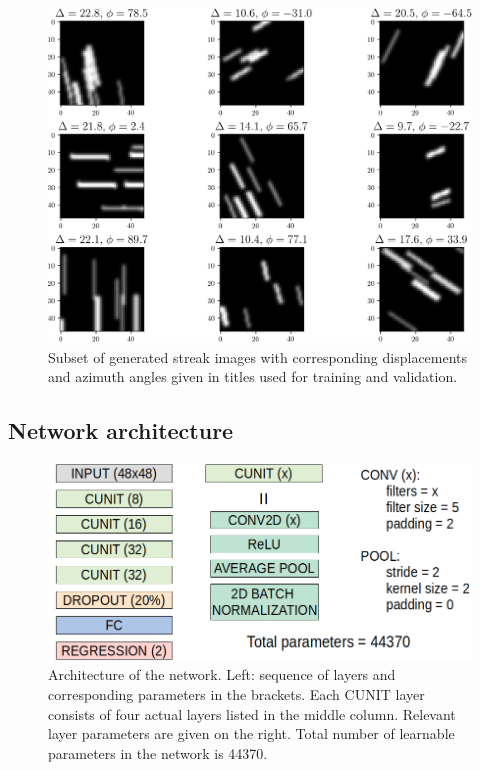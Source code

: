 \documentclass{svjour3}                     %
\begin{document}
\begin{figure}
\includegraphics[width=\textwidth]{figs/figure1.png}
\caption{Subset of generated streak images with corresponding displacements and azimuth angles given in titles used for training and validation.}
\label{fig:fig1}
\end{figure}

\subsection{Network architecture}

\begin{figure}
\includegraphics[width=\textwidth]{figs/figure2.png}
\caption{Architecture of the network. Left: sequence of layers and corresponding parameters in the brackets. Each CUNIT layer consists of four actual layers listed in the middle column. Relevant layer parameters are given on the right. Total number of learnable parameters in the network is 44370.}
\label{fig:fig1}
\end{figure}
\end{document}
